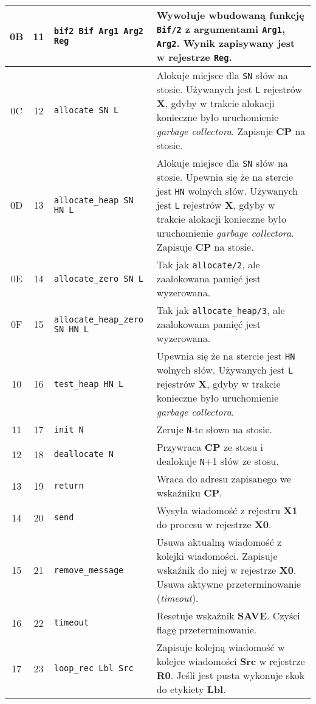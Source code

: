 \begin{longtable}{|c|c|p{5cm}|p{7cm}|}
\hline
0B & 11 & \texttt{bif2 Bif Arg1 Arg2 Reg} & Wywołuje wbudowaną funkcję \texttt{Bif/2} z argumentami \texttt{Arg1}, \texttt{Arg2}. Wynik zapisywany jest w rejestrze \texttt{Reg}. \\
\hline
0C & 12 & \texttt{allocate SN L} & Alokuje miejsce dla \texttt{SN} słów na stosie. Używanych jest \texttt{L} rejestrów \textbf{X}, gdyby w trakcie alokacji konieczne było uruchomienie \emph{garbage collectora}. Zapisuje \textbf{CP} na stosie. \\
\hline
0D & 13 & \texttt{allocate\_heap SN HN L} & Alokuje miejsce dla \texttt{SN} słów na stosie. Upewnia się że na stercie jest \texttt{HN} wolnych słów. Używanych jest \texttt{L} rejestrów \textbf{X}, gdyby w trakcie alokacji konieczne było uruchomienie \emph{garbage collectora}. Zapisuje \textbf{CP} na stosie. \\
\hline
0E & 14 & \texttt{allocate\_zero SN L} & Tak jak \texttt{allocate/2}, ale zaalokowana pamięć jest wyzerowana. \\
\hline
0F & 15 & \texttt{allocate\_heap\_zero SN HN L} & Tak jak \texttt{allocate\_heap/3}, ale zaalokowana pamięć jest wyzerowana. \\
\hline
10 & 16 & \texttt{test\_heap HN L} & Upewnia się że na stercie jest \texttt{HN} wolnych słów. Używanych jest \texttt{L} rejestrów \textbf{X}, gdyby w trakcie konieczne było uruchomienie \emph{garbage collectora}.\\
\hline
11 & 17 & \texttt{init N} & Zeruje \texttt{N}-te słowo na stosie.\\
\hline
12 & 18 & \texttt{deallocate N} & Przywraca \textbf{CP} ze stosu i dealokuje \texttt{N}+1 słów ze stosu.\\
\hline
13 & 19 & \texttt{return} & Wraca do adresu zapisanego we wskaźniku \textbf{CP}.\\
\hline
14 & 20 & \texttt{send} & Wysyła wiadomość z rejestru \textbf{X1} do procesu w rejestrze \textbf{X0}. \\
\hline
15 & 21 & \texttt{remove\_message} & Usuwa aktualną wiadomość z kolejki wiadomości. Zapisuje wskaźnik do niej w rejestrze \textbf{X0}. Usuwa aktywne przeterminowanie (\emph{timeout}). \\
\hline
16 & 22 & \texttt{timeout} & Resetuje wskaźnik \textbf{SAVE}. Czyści flagę przeterminowanie. \\
\hline
17 & 23 & \texttt{loop\_rec Lbl Src} & Zapisuje kolejną wiadomość w kolejce wiadomości \textbf{Src} w rejestrze \textbf{R0}. Jeśli jest pusta wykonuje skok do etykiety \textbf{Lbl}. \\

\end{longtable}
